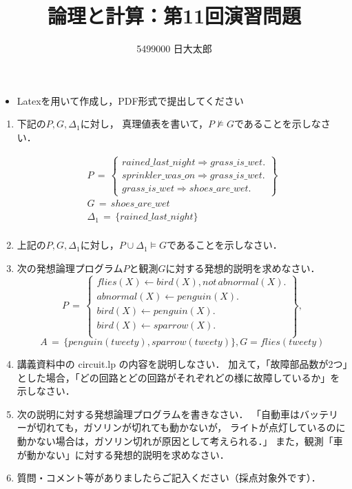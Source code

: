 \documentclass[dvipdfmx]{jsarticle}
\def\NO{11}
\def\LECTURENAME{論理と計算}
\begin{document}
\title{\LECTURENAME{}：第\NO{}回演習問題}

\author{5499000 日大太郎}

\date{}
\maketitle

\begin{itemize}
\item Latexを用いて作成し，PDF形式で提出してください
\end{itemize}


\vspace*{\baselineskip}

\begin{enumerate}\setlength{\itemsep}{\baselineskip}

\item 下記の$P, G, \Delta_1$に対し，
  真理値表を書いて，$P\not\models G$であることを示しなさい．

\[
\renewcommand{\arraystretch}{1.5}
\begin{array}{l}
P\,=\,
\left\{
\begin{array}{l}
  rained\_last\_night\Rightarrow  grass\_is\_wet.\\
  sprinkler\_was\_on \Rightarrow grass\_is\_wet.\\
  grass\_is\_wet \Rightarrow shoes\_are\_wet.
\end{array}
\right\}\\
G\,=\,shoes\_are\_wet\\
\Delta_1\,=\,\{ rained\_last\_night\}\\
\end{array}
\]

\item 上記の$P,G,\Delta_1$に対し，$P\cup \Delta_1\models G$であることを示しなさい．


\item 次の発想論理プログラム$P$と観測$G$に対する発想的説明を求めなさい．
\[
P\,=\,
\left\{
\begin{array}{l}
flies(X)\leftarrow bird(X),not \, abnormal(X).\\
abnormal(X)\leftarrow  penguin(X).\\
bird(X)\leftarrow  penguin(X).\\
bird(X)\leftarrow  sparrow(X).\\
\end{array}
\right\},
\]
\[
A\,=\,\{penguin(tweety), sparrow(tweety)\}, G = flies(tweety)
\]


\item 講義資料中の circuit.lp の内容を説明しなさい．
  加えて，「故障部品数が2つ」とした場合，「どの回路とどの回路がそれぞれどの様に故障しているか」を示しなさい．

\item
  次の説明に対する発想論理プログラムを書きなさい．
「自動車はバッテリーが切れても，ガソリンが切れても動かないが，
ライトが点灯しているのに動かない場合は，ガソリン切れが原因として考えられる．」
%
また，観測「車が動かない」に対する発想的説明を求めなさい．


\item 質問・コメント等がありましたらご記入ください（採点対象外です）．
\end{enumerate}
\end{document}
